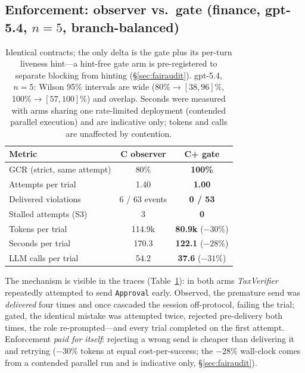 \documentclass{article}
\begin{document}
\subsection{Enforcement: observer vs.\ gate (finance, gpt-5.4, $n{=}5$, branch-balanced)}
\begin{table}[t]
\centering\small
\caption{Identical contracts; the only delta is the gate plus its per-turn liveness hint---a hint-free gate arm is pre-registered to separate blocking from hinting (\S\ref{sec:fairaudit}). gpt-5.4, $n{=}5$: Wilson 95\% intervals are wide (80\%$\to[38,96]\%$, 100\%$\to[57,100]\%$) and overlap. Seconds were measured with arms sharing one rate-limited deployment (contended parallel execution) and are indicative only; tokens and calls are unaffected by contention.}
\label{tab:gate}
\begin{tabular}{@{}lcc@{}}
\toprule
\textbf{Metric} & \textbf{C observer} & \textbf{C+ gate} \\
\midrule
GCR (strict, same attempt) & 80\% & \textbf{100\%} \\
Attempts per trial & 1.40 & \textbf{1.00} \\
Delivered violations & 6 / 63 events & \textbf{0 / 53} \\
Stalled attempts (S3) & 3 & \textbf{0} \\
Tokens per trial & 114.9k & \textbf{80.9k} ($-30\%$) \\
Seconds per trial & 170.3 & \textbf{122.1} ($-28\%$) \\
LLM calls per trial & 54.2 & \textbf{37.6} ($-31\%$) \\
\bottomrule
\end{tabular}
\end{table}
The mechanism is visible in the traces (Table~\ref{tab:gate}): in both arms \textit{TaxVerifier} repeatedly attempted to send \texttt{Approval} early. Observed, the premature send was \emph{delivered} four times and once cascaded the session off-protocol, failing the trial; gated, the identical mistake was attempted twice, rejected pre-delivery both times, the role re-prompted---and every trial completed on the first attempt. Enforcement \emph{paid for itself}: rejecting a wrong send is cheaper than delivering it and retrying ($-30\%$ tokens at equal cost-per-success; the $-28\%$ wall-clock comes from a contended parallel run and is indicative only, \S\ref{sec:fairaudit}).
\end{document}
